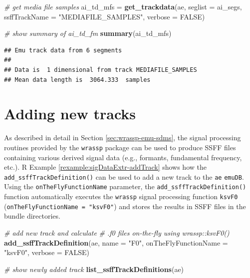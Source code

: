 \documentclass[]{book}
\newenvironment{Shaded}{\begin{snugshade}}{\end{snugshade}}
\newcommand{\CommentTok}[1]{\textcolor[rgb]{0.56,0.35,0.01}{\textit{#1}}}
\newcommand{\DataTypeTok}[1]{\textcolor[rgb]{0.13,0.29,0.53}{#1}}
\newcommand{\KeywordTok}[1]{\textcolor[rgb]{0.13,0.29,0.53}{\textbf{#1}}}
\newcommand{\NormalTok}[1]{#1}
\newcommand{\OtherTok}[1]{\textcolor[rgb]{0.56,0.35,0.01}{#1}}
\newcommand{\StringTok}[1]{\textcolor[rgb]{0.31,0.60,0.02}{#1}}
\theoremstyle{definition}
\theoremstyle{definition}
\theoremstyle{definition}
\theoremstyle{remark}
\begin{document}
\begin{Shaded}
\begin{Highlighting}[]
\CommentTok{# get media file samples}
\NormalTok{ai_td_mfs =}\StringTok{ }\KeywordTok{get_trackdata}\NormalTok{(ae,}
                          \DataTypeTok{seglist =}\NormalTok{ ai_segs,}
                          \DataTypeTok{ssffTrackName =} \StringTok{"MEDIAFILE_SAMPLES"}\NormalTok{,}
                          \DataTypeTok{verbose =} \OtherTok{FALSE}\NormalTok{)}

\CommentTok{# show summary of ai_td_fm}
\KeywordTok{summary}\NormalTok{(ai_td_mfs)}
\end{Highlighting}
\end{Shaded}

\begin{verbatim}
## Emu track data from 6 segments
## 
## Data is  1 dimensional from track MEDIAFILE_SAMPLES 
## Mean data length is  3064.333  samples
\end{verbatim}

\hypertarget{adding-new-tracks}{%
\section{Adding new tracks}\label{adding-new-tracks}}

As described in detail in Section \ref{sec:wrassp-emu-sdms}, the signal
processing routines provided by the \texttt{wrassp} package can be used
to produce SSFF files containing various derived signal data (e.g.,
formants, fundamental frequency, etc.). R Example
\ref{rexample:sigDataExtr-addTrack} shows how the
\texttt{add\_ssffTrackDefinition()} can be used to add a new track to
the \texttt{ae} \texttt{emuDB}. Using the \texttt{onTheFlyFunctionName}
parameter, the \texttt{add\_ssffTrackDefinition()} function
automatically executes the \texttt{wrassp} signal processing function
\texttt{ksvF0} (\texttt{onTheFlyFunctionName\ =\ "ksvF0"}) and stores
the results in SSFF files in the bundle directories.

\begin{Shaded}
\begin{Highlighting}[]
\CommentTok{# add new track and calculate}
\CommentTok{# .f0 files on-the-fly using wrassp::ksvF0()}
\KeywordTok{add_ssffTrackDefinition}\NormalTok{(ae,}
                        \DataTypeTok{name =} \StringTok{"F0"}\NormalTok{,}
                        \DataTypeTok{onTheFlyFunctionName =} \StringTok{"ksvF0"}\NormalTok{,}
                        \DataTypeTok{verbose =} \OtherTok{FALSE}\NormalTok{)}

\CommentTok{# show newly added track}
\KeywordTok{list_ssffTrackDefinitions}\NormalTok{(ae)}
\end{Highlighting}
\end{Shaded}
\end{document}
